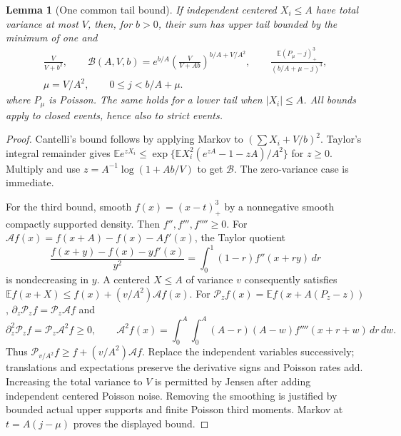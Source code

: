\documentclass[11pt,a4paper]{article}
\numberwithin{equation}{section}
\newtheorem{lemma}[theorem]{Lemma}
\theoremstyle{definition}
\theoremstyle{remark}
\begin{document}
\begin{lemma}[One common tail bound]\label{cut49:shortloc:tails}
If independent centered $X_i\le A$ have total variance at most $V$, then,
for $b>0$, their sum has upper tail bounded by the minimum of one and
\begin{equation}\label{cut49:shortloc:tailmin}
 \begin{gathered}
 \frac{V}{V+b^2},\qquad
 \mathcal B(A,V,b)=e^{b/A}\left(\frac{V}{V+Ab}\right)^{b/A+V/A^2},\qquad
 \frac{\mathbb E(P_\mu-j)_+^3}{(b/A+\mu-j)^3},\\
 \mu=V/A^2,\qquad 0\le j<b/A+\mu.
 \end{gathered}
\end{equation}
where $P_\mu$ is Poisson. The same holds for a lower tail when $|X_i|\le A$.
All bounds apply to closed events, hence also to strict events.
\end{lemma}
\begin{proof}
Cantelli's bound follows by applying Markov to $(\sum X_i+V/b)^2$.
Taylor's integral remainder gives
$\mathbb E e^{zX_i}\le\exp\{\mathbb E X_i^2(e^{zA}-1-zA)/A^2\}$
for $z\ge0$. Multiply and use $z=A^{-1}\log(1+Ab/V)$ to get $\mathcal B$.
The zero-variance case is immediate.

For the third bound, smooth $f(x)=(x-t)_+^3$ by a nonnegative smooth
compactly supported density. Then $f'',f''',f''''\ge0$. For
$\mathcal Af(x)=f(x+A)-f(x)-Af'(x)$, the Taylor quotient
\[
 \frac{f(x+y)-f(x)-yf'(x)}{y^2}
       =\int_0^1(1-r)f''(x+ry)\,dr
\]
is nondecreasing in $y$. A centered $X\le A$ of variance $v$ consequently
satisfies $\mathbb E f(x+X)\le f(x)+(v/A^2)\mathcal Af(x)$.
For $\mathcal P_zf(x)=\mathbb E f(x+A(P_z-z))$,
$\partial_z\mathcal P_zf=\mathcal P_z\mathcal Af$ and
\[
 \partial_z^2\mathcal P_zf=\mathcal P_z\mathcal A^2f\ge0,\qquad
 \mathcal A^2f(x)=\int_0^A\!\int_0^A(A-r)(A-w)f''''(x+r+w)\,dr\,dw.
\]
Thus $\mathcal P_{v/A^2}f\ge f+(v/A^2)\mathcal Af$. Replace the independent
variables successively; translations and expectations preserve the derivative
signs and Poisson rates add. Increasing the total variance to $V$ is permitted
by Jensen after adding independent centered Poisson noise. Removing the
smoothing is justified by bounded actual upper supports and finite Poisson
third moments. Markov at $t=A(j-\mu)$ proves the displayed bound.
\end{proof}
\end{document}
